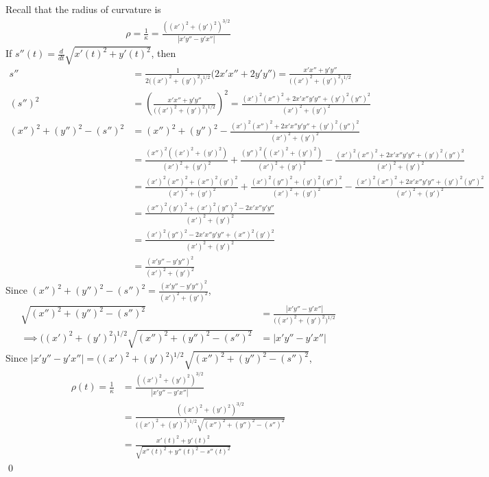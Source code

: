 \documentclass{article}
\newcommand{\lrp}[1]{\left( #1 \right)}
\begin{document}
Recall that the radius of curvature is
\begin{align*}
    \rho=\frac{1}{\kappa}=\frac{((x')^2+(y')^2)^{3/2}}{\left|x'y''-y'x''\right|}
\end{align*}
If $\displaystyle s''(t)=\frac{d}{dt}\sqrt{x'(t)^2+y'(t)^2}$, then
\begin{align*}
    s''&=\frac{1}{2\big((x')^2+(y')^2\big)^{1/2}}\big(2x'x''+2y'y''\big)=\frac{x'x''+y'y''}{\big((x')^2+(y')^2\big)^{1/2}}\\
    \lrp{s''}^2&=\lrp{\frac{x'x''+y'y''}{\big((x')^2+(y')^2\big)^{1/2}}}^2=\frac{\lrp{x'}^2\lrp{x''}^2+2x'x''y'y''+\lrp{y'}^2\lrp{y''}^2}{(x')^2+(y')^2}\\
    \lrp{x''}^2+\lrp{y''}^2-\lrp{s''}^2&= \lrp{x''}^2+\lrp{y''}^2-\frac{\lrp{x'}^2\lrp{x''}^2+2x'x''y'y''+\lrp{y'}^2\lrp{y''}^2}{(x')^2+(y')^2}\\
    &=\frac{\lrp{x''}^2\lrp{(x')^2+(y')^2}}{(x')^2+(y')^2}+\frac{\lrp{y''}^2\lrp{(x')^2+(y')^2}}{(x')^2+(y')^2}-\frac{\lrp{x'}^2\lrp{x''}^2+2x'x''y'y''+\lrp{y'}^2\lrp{y''}^2}{(x')^2+(y')^2}\\
    &=\frac{\lrp{x'}^2\lrp{x''}^2+\lrp{x''}^2\lrp{y'}^2}{(x')^2+(y')^2}+\frac{\lrp{x'}^2\lrp{y''}^2+\lrp{y'}^2\lrp{y''}^2}{(x')^2+(y')^2}-\frac{\lrp{x'}^2\lrp{x''}^2+2x'x''y'y''+\lrp{y'}^2\lrp{y''}^2}{(x')^2+(y')^2}\\
    &=\frac{\lrp{x''}^2\lrp{y'}^2+\lrp{x'}^2\lrp{y''}^2-2x'x''y'y''}{\lrp{x'}^2+\lrp{y'}^2}\\
    &=\frac{\lrp{x'}^2\lrp{y''}^2-2x'x''y'y''+\lrp{x''}^2\lrp{y'}^2}{\lrp{x'}^2+\lrp{y'}^2}\\
    &=\frac{\lrp{x'y''-y'y''}^2}{\lrp{x'}^2+\lrp{y'}^2}\tag{factor}
\end{align*}
Since $\displaystyle \lrp{x''}^2+\lrp{y''}^2-\lrp{s''}^2=\frac{\lrp{x'y''-y'y''}^2}{\lrp{x'}^2+\lrp{y'}^2}$,
\begin{align*}
    \sqrt{\lrp{x''}^2+\lrp{y''}^2-\lrp{s''}^2}&=\frac{\left|x'y''-y'x''\right|}{\big(\lrp{x'}^2+\lrp{y'}^2\big)^{1/2}}\\
    \implies \big(\lrp{x'}^2+\lrp{y'}^2\big)^{1/2}\sqrt{\lrp{x''}^2+\lrp{y''}^2-\lrp{s''}^2}&=\left|x'y''-y'x''\right|
\end{align*}
Since $\displaystyle \left|x'y''-y'x''\right|=\big(\lrp{x'}^2+\lrp{y'}^2\big)^{1/2}\sqrt{\lrp{x''}^2+\lrp{y''}^2-\lrp{s''}^2}$,
\begin{align*}
    \rho(t)=\frac{1}{\kappa}&=\frac{((x')^2+(y')^2)^{3/2}}{\left|x'y''-y'x''\right|}\tag{recall from above}\\
    &=\frac{((x')^2+(y')^2)^{3/2}}{\big(\lrp{x'}^2+\lrp{y'}^2\big)^{1/2}\sqrt{\lrp{x''}^2+\lrp{y''}^2-\lrp{s''}^2}}\\
    &=\frac{x'(t)^2+y'(t)^2}{\sqrt{x''(t)^2+y''(t)^2-s''(t)^2}}\tag{adding the $(t)$ for notational fluff}
\end{align*}
\qed
\end{document}
